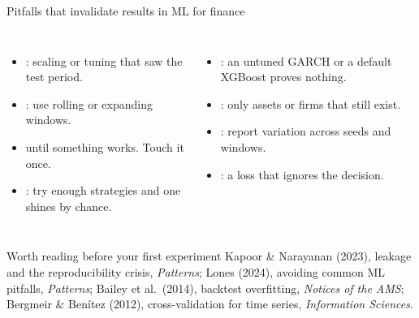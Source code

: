 \documentclass[aspectratio=169,11pt,t]{beamer}
\begin{document}
\begin{frame}{Pitfalls that invalidate results in ML for finance}
  \begin{columns}[T,onlytextwidth]
    \begin{itemize}
      \item {}: scaling or tuning that saw the test period.
      \item {}: use rolling or expanding windows.
      \item {} until something works. Touch it once.
      \item {}: try enough strategies and one shines by chance.
    \end{itemize}
    \begin{itemize}
      \item {}: an untuned GARCH or a default XGBoost proves nothing.
      \item {}: only assets or firms that still exist.
      \item {}: report variation across seeds and windows.
      \item {}: a loss that ignores the decision.
    \end{itemize}
  \end{columns}

  \begin{block}{Worth reading before your first experiment}
    \footnotesize Kapoor \& Narayanan (2023), leakage and the reproducibility crisis, \emph{Patterns};
    Lones (2024), avoiding common ML pitfalls, \emph{Patterns};
    Bailey et al.\ (2014), backtest overfitting, \emph{Notices of the AMS};
    Bergmeir \& Benítez (2012), cross-validation for time series, \emph{Information Sciences}.
  \end{block}
\end{frame}
\end{document}

